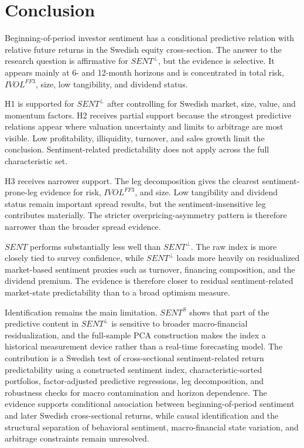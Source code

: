 \documentclass[11pt]{article}
\newcommand{\var}[1]{\ensuremath{#1}}
\begin{document}
\section{Conclusion}
Beginning-of-period investor sentiment has a conditional predictive relation with relative future returns in the Swedish equity cross-section. The answer to the research question is affirmative for \var{SENT^{\perp}}, but the evidence is selective. It appears mainly at 6- and 12-month horizons and is concentrated in total risk, \var{IVOL^{FF3}}, size, low tangibility, and dividend status.

H1 is supported for \var{SENT^{\perp}} after controlling for Swedish market, size, value, and momentum factors. H2 receives partial support because the strongest predictive relations appear where valuation uncertainty and limits to arbitrage are most visible. Low profitability, illiquidity, turnover, and sales growth limit the conclusion. Sentiment-related predictability does not apply across the full characteristic set.

H3 receives narrower support. The leg decomposition gives the clearest sentiment-prone-leg evidence for risk, \var{IVOL^{FF3}}, and size. Low tangibility and dividend status remain important spread results, but the sentiment-insensitive leg contributes materially. The stricter overpricing-asymmetry pattern is therefore narrower than the broader spread evidence.

\var{SENT} performs substantially less well than \var{SENT^{\perp}}. The raw index is more closely tied to survey confidence, while \var{SENT^{\perp}} loads more heavily on residualized market-based sentiment proxies such as turnover, financing composition, and the dividend premium. The evidence is therefore closer to residual sentiment-related market-state predictability than to a broad optimism measure.

Identification remains the main limitation. \var{SENT^{S}} shows that part of the predictive content in \var{SENT^{\perp}} is sensitive to broader macro-financial residualization, and the full-sample PCA construction makes the index a historical measurement device rather than a real-time forecasting model. The contribution is a Swedish test of cross-sectional sentiment-related return predictability using a constructed sentiment index, characteristic-sorted portfolios, factor-adjusted predictive regressions, leg decomposition, and robustness checks for macro contamination and horizon dependence. The evidence supports conditional association between beginning-of-period sentiment and later Swedish cross-sectional returns, while causal identification and the structural separation of behavioral sentiment, macro-financial state variation, and arbitrage constraints remain unresolved.
\end{document}
